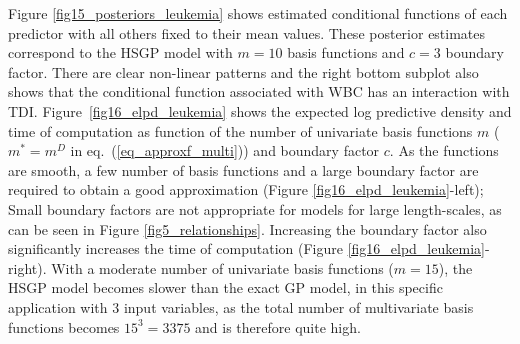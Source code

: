 Figure \ref{fig15_posteriors_leukemia} shows estimated conditional functions of each predictor with all others fixed to their mean values. These posterior estimates correspond to the HSGP model with $m=10$ basis functions and $c=3$ boundary factor. There are clear  non-linear patterns and the right bottom subplot also shows that the conditional function associated with WBC has an interaction with TDI.
Figure~\ref{fig16_elpd_leukemia} shows the expected log predictive density \citep[ELPD; ][]{vehtari_2012,Vehtari+Gelman+Gabry:2017_practical} and time of computation as function of the number of univariate basis functions $m$ ($m^{\ast}=m^D$ in eq.~(\ref{eq_approxf_multi})) and boundary factor $c$. As the functions are smooth, a few number of basis functions and a large boundary factor are required to obtain a good approximation (Figure \ref{fig16_elpd_leukemia}-left); Small boundary factors are not appropriate for models for large length-scales, as can be seen in Figure \ref{fig5_relationships}. Increasing the boundary factor also significantly increases the time of computation (Figure \ref{fig16_elpd_leukemia}-right). With a moderate number of univariate basis functions ($m=15$), the HSGP model becomes slower than the exact GP model, in this specific application with $3$ input variables, as the total number of multivariate basis functions becomes $15^3 = 3375$ and is therefore quite high. 
%
